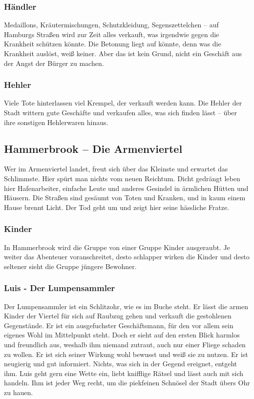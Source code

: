 \subsubsection*{Händler}
\label{Händler}

Medaillons, Kräutermischungen, Schutzkleidung, Segenszettelchen – auf Hamburgs Straßen wird zur Zeit alles verkauft, was irgendwie gegen die Krankheit schützen könnte. Die Betonung liegt auf könnte, denn was die Krankheit auslöst, weiß keiner. Aber das ist kein Grund, nicht ein Geschäft aus der Angst der Bürger zu machen.

\subsubsection*{Hehler}
\label{Hehler}

Viele Tote hinterlassen viel Krempel, der verkauft werden kann. Die Hehler der Stadt wittern gute Geschäfte und verkaufen alles, was sich finden lässt – über ihre sonstigen Hehlerwaren hinaus.


\subsection{Hammerbrook – Die Armenviertel}

Wer im Armenviertel landet, freut sich über das Kleinste und erwartet das Schlimmste. Hier spürt man nichts vom neuen Reichtum. Dicht gedrängt leben hier Hafenarbeiter, einfache Leute und anderes Gesindel in ärmlichen Hütten und Häusern. Die Straßen sind gesäumt von Toten und Kranken, und in kaum einem Hause brennt Licht. Der Tod geht um und zeigt hier seine hässliche Fratze.

\subsubsection*{Kinder}
\label{Kinder}

In Hammerbrook wird die Gruppe von einer Gruppe Kinder ausgeraubt. Je weiter das Abenteuer voranschreitet, desto schlapper wirken die Kinder und desto seltener sieht die Gruppe jüngere Bewohner.

\subsubsection*{Luis - Der Lumpensammler}
\label{Luis}

Der Lumpensammler ist ein Schlitzohr, wie es im Buche steht. Er lässt die armen Kinder der Viertel für sich auf Raubzug gehen und verkauft die gestohlenen Gegenstände. Er ist ein ausgefuchster Geschäftsmann, für den vor allem sein eigenes Wohl im Mittelpunkt steht. Doch er sieht auf den ersten Blick harmlos und freundlich aus, weshalb ihm niemand zutraut, auch nur einer Fliege schaden zu wollen. Er ist sich seiner Wirkung wohl bewusst und weiß sie zu nutzen. Er ist neugierig und gut informiert. Nichts, was sich in der Gegend ereignet, entgeht ihm. Luis geht gern eine Wette ein, liebt knifflige Rätsel und lässt auch mit sich handeln. Ihm ist jeder Weg recht, um die piekfeinen Schnösel der Stadt übers Ohr zu hauen.

